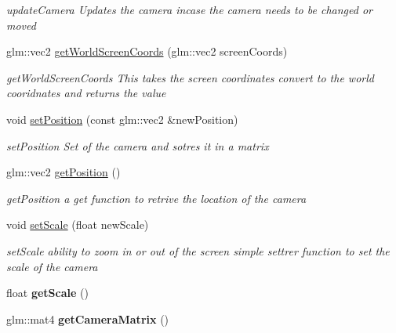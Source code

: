 \begin{DoxyCompactItemize}
\begin{DoxyCompactList}\small\item\em updateCamera Updates the camera incase the camera needs to be changed or moved \item\end{DoxyCompactList}\item 
glm::vec2 \hyperlink{classRandini_1_1Camera2D_a545b5ce7ca9f2c99b8fc7837d6ee4872}{getWorldScreenCoords} (glm::vec2 screenCoords)
\begin{DoxyCompactList}\small\item\em getWorldScreenCoords This takes the screen coordinates convert to the world cooridnates and returns the value \item\end{DoxyCompactList}\item 
void \hyperlink{classRandini_1_1Camera2D_a13745cf68d6dc73d6759b3a3ee1c4cb1}{setPosition} (const glm::vec2 \&newPosition)
\begin{DoxyCompactList}\small\item\em setPosition Set of the camera and sotres it in a matrix \item\end{DoxyCompactList}\item 
glm::vec2 \hyperlink{classRandini_1_1Camera2D_ad9bb40c09c7f51960574a795124bf1ad}{getPosition} ()
\begin{DoxyCompactList}\small\item\em getPosition a get function to retrive the location of the camera \item\end{DoxyCompactList}\item 
void \hyperlink{classRandini_1_1Camera2D_a6446d430b1c5b5c3f3435c5ebc8fdfa6}{setScale} (float newScale)
\begin{DoxyCompactList}\small\item\em setScale ability to zoom in or out of the screen simple settrer function to set the scale of the camera \item\end{DoxyCompactList}\item 
\hypertarget{classRandini_1_1Camera2D_a6e5515a9d361baef52afc11deba94426}{
float {\bfseries getScale} ()}
\label{classRandini_1_1Camera2D_a6e5515a9d361baef52afc11deba94426}

\item 
\hypertarget{classRandini_1_1Camera2D_adac18a3635569b0868c5d77e8f8635a8}{
glm::mat4 {\bfseries getCameraMatrix} ()}
\label{classRandini_1_1Camera2D_adac18a3635569b0868c5d77e8f8635a8}

\end{DoxyCompactItemize}


